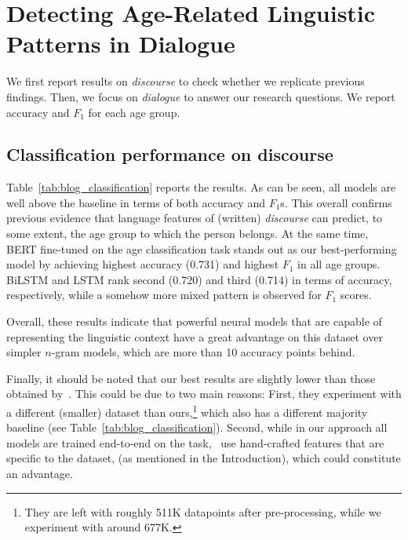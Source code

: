 \section{Detecting Age-Related Linguistic Patterns in Dialogue}
\label{sec:exp1_results}

We first report results on \emph{discourse}
to check whether we replicate
previous findings. Then, we focus on \emph{dialogue} to answer our research questions. We report accuracy and $F_1$ for each age group.

\subsection{Classification performance on discourse}
Table~\ref{tab:blog_classification} reports the results.
As can be seen,
all models are well above the baseline in terms of both accuracy and 
$F_1$s. This overall confirms previous evidence \cite{schler2006effects} that language features of (written) \emph{discourse} can predict, to some extent, the age group to which the person
belongs. At the same time, BERT fine-tuned on the age classification task stands out as our best-performing model by achieving highest accuracy (0.731) and highest $F_1$ in all age groups.
BiLSTM and LSTM rank second (0.720) and third (0.714) in terms of accuracy, respectively, while a somehow more mixed pattern is observed for $F_1$ scores.

Overall, these results indicate that powerful neural models that are capable of representing the linguistic context %
have a great advantage on this dataset over simpler $n$-gram models, which are more than 10 accuracy points behind. 

Finally, it should be noted that our best results are slightly lower than those obtained by~\citet{schler2006effects}. This could be due to two main reasons: First, they experiment with a
different (smaller)
dataset than ours,\footnote{They are left with roughly 511K datapoints after pre-processing, 
while we experiment with around 677K.}
which also 
has 
a different majority baseline (see Table~\ref{tab:blog_classification}). Second, while in our approach all models are trained end-to-end on the task,~\citet{schler2006effects} use
hand-crafted features that are specific to the dataset, (as mentioned in the Introduction), 
which could constitute an advantage.

